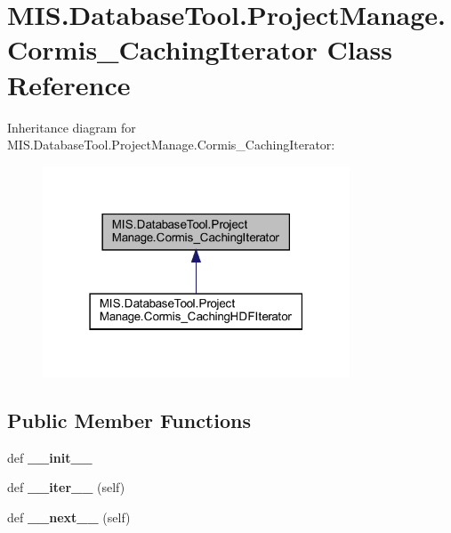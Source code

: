\hypertarget{classMIS_1_1DatabaseTool_1_1ProjectManage_1_1Cormis__CachingIterator}{}\section{M\+I\+S.\+Database\+Tool.\+Project\+Manage.\+Cormis\+\_\+\+Caching\+Iterator Class Reference}
\label{classMIS_1_1DatabaseTool_1_1ProjectManage_1_1Cormis__CachingIterator}


Inheritance diagram for M\+I\+S.\+Database\+Tool.\+Project\+Manage.\+Cormis\+\_\+\+Caching\+Iterator\+:\nopagebreak
\begin{figure}[H]
\begin{center}
\leavevmode
\includegraphics[width=259pt]{classMIS_1_1DatabaseTool_1_1ProjectManage_1_1Cormis__CachingIterator__inherit__graph}
\end{center}
\end{figure}
\subsection*{Public Member Functions}
\begin{DoxyCompactItemize}
\item 
\mbox{\label{classMIS_1_1DatabaseTool_1_1ProjectManage_1_1Cormis__CachingIterator_a279da3efc2af3addb5bd46e4a731cefa}} 
def {\bfseries \+\_\+\+\_\+init\+\_\+\+\_\+}
\item 
\mbox{\label{classMIS_1_1DatabaseTool_1_1ProjectManage_1_1Cormis__CachingIterator_a6bbf2d316dd0cbc813e2202c6ae9614b}} 
def {\bfseries \+\_\+\+\_\+iter\+\_\+\+\_\+} (self)
\item 
\mbox{\label{classMIS_1_1DatabaseTool_1_1ProjectManage_1_1Cormis__CachingIterator_a0e1fd3b82831d20eb0f84dbdd6a52e22}} 
def {\bfseries \+\_\+\+\_\+next\+\_\+\+\_\+} (self)
\end{DoxyCompactItemize}
